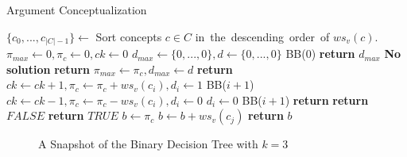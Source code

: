 \begin{algorithm}[th]
\small
\caption{Argument Conceptualization}
\label{al:backtrack}
\begin{algorithmic}[1]
\State $\{c_0,...,c_{|C|-1}\}\leftarrow$ Sort concepts $c\in C$ in\ the\ descending\ order\ of $ws_v(c)$.
\State $\pi_{max} \leftarrow 0,\pi_{c} \leftarrow 0,ck \leftarrow 0$
\State $d_{max}\leftarrow\{0,...,0\},d\leftarrow\{0,...,0\}$
\State BB($0$)
\State \textbf{return} $d_{max}$
\Else
\State \textbf{No solution}
\EndIf
\EndFunction
\Statex
{}
\State \textbf{return}
\EndIf
{}
\State $\pi_{max} \leftarrow \pi_{c}, d_{max} \leftarrow d$
\EndIf
\State \textbf{return}
\EndIf
{}
\State $ck \leftarrow ck+1, \pi_{c} \leftarrow \pi_{c}+ws_v(c_i), d_i \leftarrow 1$
\State BB($i+1$)
\State $ck \leftarrow ck-1, \pi_{c} \leftarrow \pi_{c}-ws_v(c_i), d_i \leftarrow 0$
\EndIf
{}
\State $d_i \leftarrow 0$
\State BB($i+1$)
\EndIf
\State \textbf{return}
\EndFunction
\Statex
{}
\State \textbf{return} $FALSE$
\EndIf
\EndIf
\EndFor
\State \textbf{return} $TRUE$
\EndFunction
\Statex
{}
\State $b \leftarrow \pi_{c}$
\State $b \leftarrow b+ws_v(c_{j})$
\EndFor
\State \textbf{return} $b$
\EndFunction
\end{algorithmic}
\end{algorithm}


\begin{figure}[th]
\centering
{}
\caption{A Snapshot of the Binary Decision Tree with $k=3$}
\label{fig:search_tree}
\end{figure}



